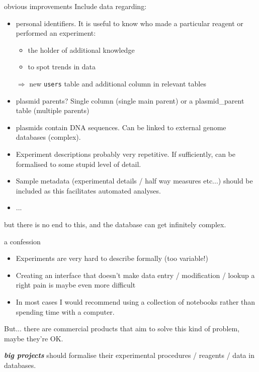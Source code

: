 \documentclass[pdf]{beamer}
\begin{document}
\begin{frame}{obvious improvements}
  Include data regarding:
  {\small
  \begin{itemize}
  \item personal identifiers. It is useful to know who made a
    particular reagent or performed an experiment:
    \begin{itemize}
    \item the holder of additional knowledge
    \item to spot trends in data
    \end{itemize}
    $\Rightarrow$ new \texttt{users} table and additional column in relevant tables
  \item plasmid parents? Single column (single main parent) or a plasmid\_parent table
    (multiple parents)
  \item plasmids contain DNA sequences. Can be linked to external genome databases (complex).
  \item Experiment descriptions probably very repetitive. If sufficiently, can be formalised
    to some stupid level of detail.
  \item Sample metadata (experimental details / half way measures etc...) should be included
    as this facilitates automated analyses.
  \item ...
  \end{itemize}
  }
  but there is no end to this, and the database can get infinitely complex.
\end{frame}

\begin{frame}{a confession}
  \pause
  \begin{itemize}
  \item Experiments are very hard to describe formally (too variable!)
    \pause
  \item Creating an interface that doesn't make data entry / modification / 
    lookup a right pain is maybe even more difficult
    \pause
  \item In most cases I would recommend using a collection of notebooks
    rather than spending time with a computer.
  \end{itemize}

  But... there are commercial products that aim to solve this kind of problem, maybe they're OK.
  \pause

  \emph{\bfseries big projects} should formalise their experimental procedures / reagents / data
  in databases.
  
\end{frame}
\end{document}
